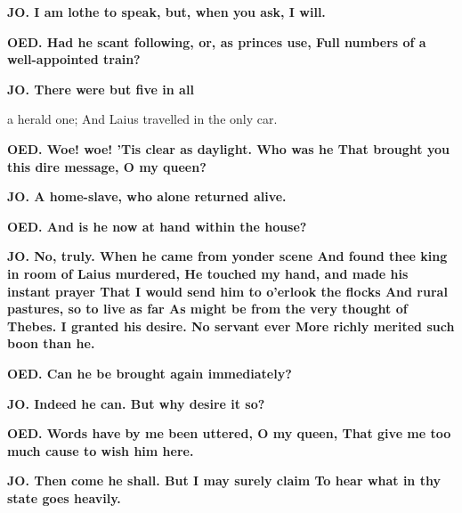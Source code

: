 \documentclass[11pt,letter]{book}
\begin{document}
\par \textbf{JO. I am lothe to speak, but, when you ask, I will.}
\par 

\par \textbf{OED. Had he scant following, or, as princes use, Full numbers of a well-appointed train?}
\par 

\par \textbf{JO. There were but five in all}
\par   a herald one; And Laius travelled in the only car.

\par \textbf{OED. Woe! woe! ’Tis clear as daylight. Who was he That brought you this dire message, O my queen?}
\par 

\par \textbf{JO. A home-slave, who alone returned alive.}
\par 

\par \textbf{OED. And is he now at hand within the house?}
\par 

\par \textbf{JO. No, truly. When he came from yonder scene And found thee king in room of Laius murdered, He touched my hand, and made his instant prayer That I would send him to o’erlook the flocks And rural pastures, so to live as far As might be from the very thought of Thebes. I granted his desire. No servant ever More richly merited such boon than he.}
\par 

\par \textbf{OED. Can he be brought again immediately?}
\par 

\par \textbf{JO. Indeed he can. But why desire it so?}
\par 

\par \textbf{OED. Words have by me been uttered, O my queen, That give me too much cause to wish him here.}
\par 

\par \textbf{JO. Then come he shall. But I may surely claim To hear what in thy state goes heavily.}
\par 
\end{document}
